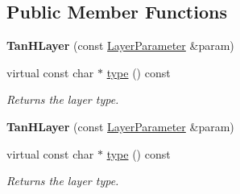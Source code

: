 \subsection*{Public Member Functions}
\begin{DoxyCompactItemize}
\item 
\mbox{\label{classcaffe_1_1_tan_h_layer_a71e5977bc3aa2d0fa7a05a956178f25b}} 
{\bfseries Tan\+H\+Layer} (const \mbox{\hyperlink{classcaffe_1_1_layer_parameter}{Layer\+Parameter}} \&param)
\item 
\mbox{\label{classcaffe_1_1_tan_h_layer_aab1526c84cd67d0de49bf2a1ee6b1bf6}} 
virtual const char $\ast$ \mbox{\hyperlink{classcaffe_1_1_tan_h_layer_aab1526c84cd67d0de49bf2a1ee6b1bf6}{type}} () const
\begin{DoxyCompactList}\small\item\em Returns the layer type. \end{DoxyCompactList}\item 
\mbox{\label{classcaffe_1_1_tan_h_layer_a71e5977bc3aa2d0fa7a05a956178f25b}} 
{\bfseries Tan\+H\+Layer} (const \mbox{\hyperlink{classcaffe_1_1_layer_parameter}{Layer\+Parameter}} \&param)
\item 
\mbox{\label{classcaffe_1_1_tan_h_layer_aab1526c84cd67d0de49bf2a1ee6b1bf6}} 
virtual const char $\ast$ \mbox{\hyperlink{classcaffe_1_1_tan_h_layer_aab1526c84cd67d0de49bf2a1ee6b1bf6}{type}} () const
\begin{DoxyCompactList}\small\item\em Returns the layer type. \end{DoxyCompactList}\end{DoxyCompactItemize}
